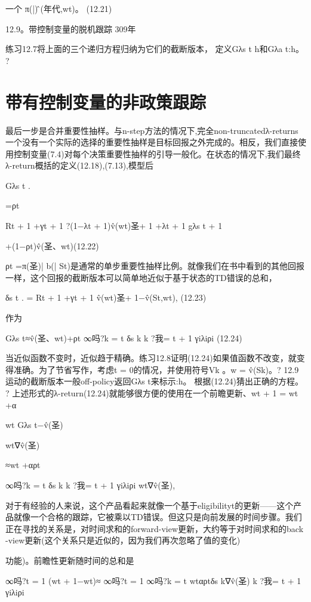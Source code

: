 一个
π(|)问̂(年代,wt)。 					(12.21)

12.9。带控制变量的脱机跟踪 					309年



练习12.7将上面的三个递归方程归纳为它们的截断版本，
定义Gλs t h和Gλa t:h。 					?


\section{带有控制变量的非政策跟踪}

最后一步是合并重要性抽样。与n-step方法的情况下,完全non-truncatedλ-returns一个没有一个实际的选择的重要性抽样是目标回报之外完成的。相反，我们直接使用控制变量(7.4)对每个决策重要性抽样的引导一般化。在状态的情况下,我们最终λ-return概括的定义(12.18),(7.13),模型后

Gλs t
.

=ρt

Rt + 1 +γt + 1
?(1−λt + 1)v̂(wt)圣+ 1 +λt + 1 gλs t + 1

+(1−ρt)v̂(圣、wt)(12.22)

ρt =π(圣)| b(| St)是通常的单步重要性抽样比例。就像我们在书中看到的其他回报一样，这个回报的截断版本可以简单地近似于基于状态的TD错误的总和，

δs t
.
= Rt + 1 +γt + 1 v̂(wt)圣+ 1−v̂(St,wt), 					(12.23)

作为


Gλs t≈v̂(圣、wt)+ρt
∞吗?k = t
δs k
k ?我= t + 1
γiλiρi 					(12.24)


当近似函数不变时，近似趋于精确。练习12.8证明(12.24)如果值函数不改变，就变得准确。为了节省写作，考虑t = 0的情况，并使用符号Vk
。w = v̂(Sk)。?
12.9运动的截断版本一般off-policy返回Gλs t来标示:h。
根据(12.24)猜出正确的方程。 					?
上述形式的λ-return(12.24)就能够很方便的使用在一个前瞻更新、wt + 1 = wt +α

wt Gλs t−v̂(圣)

wt∇v̂(圣)

≈wt +αρt

∞吗?k = t
δs k
k ?我= t + 1
γiλiρi
wt∇v̂(圣),


对于有经验的人来说，这个产品看起来就像一个基于eligibilityt的更新——这个产品就像一个合格的跟踪，它被乘以TD错误。但这只是向前发展的时间步骤。我们正在寻找的关系是，对时间求和的forward-view更新，大约等于对时间求和的back -view更新(这个关系只是近似的，因为我们再次忽略了值的变化)

功能)。前瞻性更新随时间的总和是

∞吗?t = 1
(wt + 1−wt)≈
∞吗?t = 1
∞吗?k = t
wtαρtδs k∇v̂(圣)
k ?我= t + 1
γiλiρi


